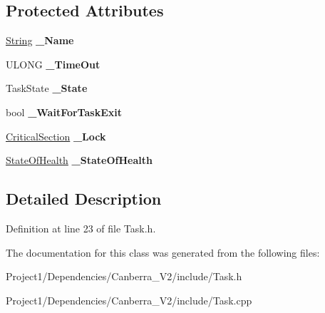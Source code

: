 \subsection*{Protected Attributes}
\begin{DoxyCompactItemize}
\item 
\mbox{\label{class_canberra_1_1_utility_1_1_core_1_1_task_a5ac2bc9406ef2e83a93249a930a6f636}} 
\hyperlink{class_canberra_1_1_utility_1_1_core_1_1_string}{String} {\bfseries \+\_\+\+Name}
\item 
\mbox{\label{class_canberra_1_1_utility_1_1_core_1_1_task_a5323a67348a28c7bf193082f77446efa}} 
U\+L\+O\+NG {\bfseries \+\_\+\+Time\+Out}
\item 
\mbox{\label{class_canberra_1_1_utility_1_1_core_1_1_task_ae9e32f10943945f3749302c489747857}} 
Task\+State {\bfseries \+\_\+\+State}
\item 
\mbox{\label{class_canberra_1_1_utility_1_1_core_1_1_task_aae5ae3af1ab26e8aa840874e60dea54f}} 
bool {\bfseries \+\_\+\+Wait\+For\+Task\+Exit}
\item 
\mbox{\label{class_canberra_1_1_utility_1_1_core_1_1_task_a139475f6f0548e343dc98fc2a19bbe9f}} 
\hyperlink{class_canberra_1_1_utility_1_1_core_1_1_critical_section}{Critical\+Section} {\bfseries \+\_\+\+Lock}
\item 
\mbox{\label{class_canberra_1_1_utility_1_1_core_1_1_task_a045e64444b00a9f905f460e221e6846f}} 
\hyperlink{class_canberra_1_1_utility_1_1_core_1_1_state_of_health}{State\+Of\+Health} {\bfseries \+\_\+\+State\+Of\+Health}
\end{DoxyCompactItemize}


\subsection{Detailed Description}


Definition at line 23 of file Task.\+h.



The documentation for this class was generated from the following files\+:\begin{DoxyCompactItemize}
\item 
Project1/\+Dependencies/\+Canberra\+\_\+\+V2/include/Task.\+h\item 
Project1/\+Dependencies/\+Canberra\+\_\+\+V2/include/Task.\+cpp\end{DoxyCompactItemize}
